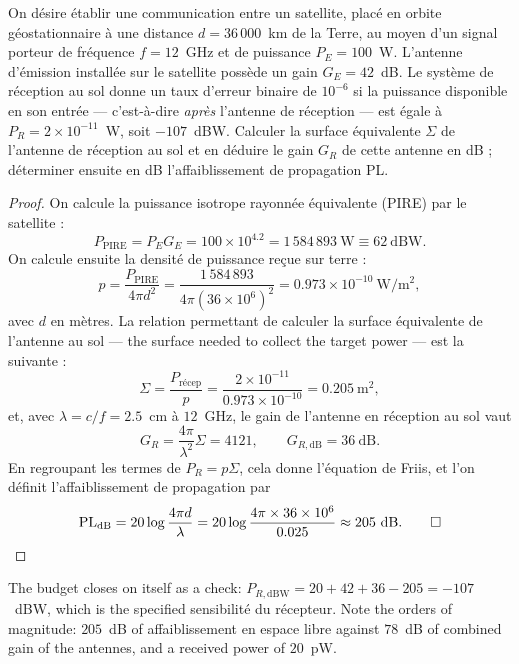 \begin{problem}
  On désire établir une communication entre un satellite, placé en orbite
  géostationnaire à une distance $d = 36\,000$~km de la Terre, au moyen d'un
  signal porteur de fréquence $f = 12$~GHz et de puissance $P_E = 100$~W.
  L'antenne d'émission installée sur le satellite possède un gain
  $G_E = 42$~dB. Le système de réception au sol donne un taux d'erreur binaire
  de $10^{-6}$ si la puissance disponible en son entrée --- c'est-à-dire
  \emph{après} l'antenne de réception --- est égale à
  $P_R = 2 \times 10^{-11}$~W, soit $-107$~dBW. Calculer la surface
  équivalente $\Sigma$ de l'antenne de réception au sol et en déduire le gain
  $G_R$ de cette antenne en dB ; déterminer ensuite en dB l'affaiblissement de
  propagation PL.
\end{problem}

\begin{proof}
  On calcule la puissance isotrope rayonnée équivalente (PIRE) par le
  satellite :
  \[ P_{\mathrm{PIRE}} = P_E G_E = 100 \times 10^{4.2} = 1\,584\,893\ \mathrm{W}
     \equiv 62\ \mathrm{dBW}. \]
  On calcule ensuite la densité de puissance reçue sur terre :
  \[ p = \frac{P_{\mathrm{PIRE}}}{4 \pi d^2}
       = \frac{1\,584\,893}{4 \pi \left(36 \times 10^{6}\right)^{2}}
       = 0.973 \times 10^{-10}\ \mathrm{W/m^2}, \]
  avec $d$ en mètres. La relation permettant de calculer la surface
  équivalente de l'antenne au sol --- the surface needed to collect the target
  power --- est la suivante :
  \[ \Sigma = \frac{P_{\text{récep}}}{p}
     = \frac{2 \times 10^{-11}}{0.973 \times 10^{-10}} = 0.205\ \mathrm{m^2}, \]
  et, avec $\lambda = c/f = 2.5$~cm à $12$~GHz, le gain de l'antenne en
  réception au sol vaut
  \[ G_R = \frac{4\pi}{\lambda^2}\Sigma = 4121, \qquad G_{R,\mathrm{dB}} = 36\ \mathrm{dB}. \]
  En regroupant les termes de $P_R = p \Sigma$, cela donne l'équation de Friis,
  et l'on définit l'affaiblissement de propagation par
  \[ \mathrm{PL}_{\mathrm{dB}} = 20 \log \frac{4 \pi d}{\lambda}
     = 20 \log \frac{4\pi \times 36 \times 10^6}{0.025} \approx 205\ \mathrm{dB}. \qed \]
\end{proof}

\begin{remark}
  The budget closes on itself as a check:
  $P_{R,\mathrm{dBW}} = 20 + 42 + 36 - 205 = -107$~dBW, which is the specified
  sensibilité du récepteur. Note the orders of magnitude: $205$~dB of
  affaiblissement en espace libre against $78$~dB of combined gain of the
  antennes, and a received power of $20$~pW.
\end{remark}


